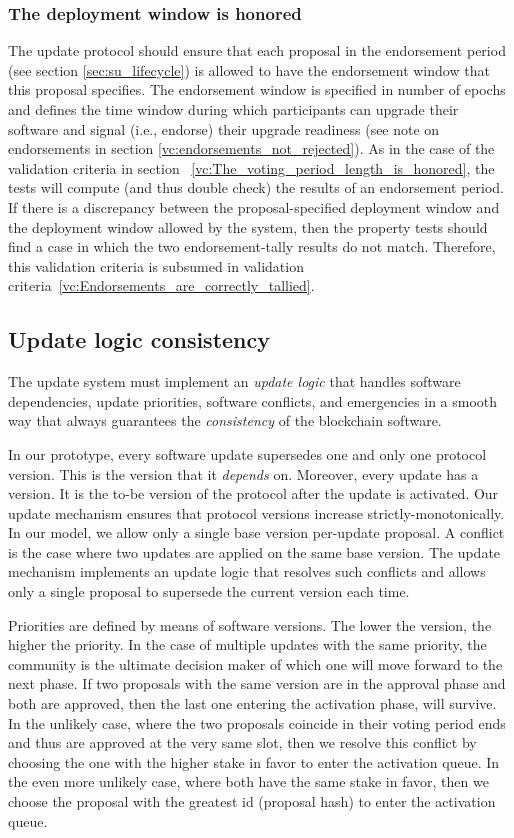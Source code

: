 \subsubsection{The deployment window is honored}
\label{vc:The_deployment_window_is_honored}

The update protocol should ensure that each proposal in the endorsement period
(see section \ref{sec:su_lifecycle}) is allowed to have the endorsement window
that this proposal specifies. The endorsement window is specified in number of
epochs and defines the time window during which participants can upgrade their
software and signal (i.e., endorse) their upgrade readiness (see note on
endorsements in  section \ref{vc:endorsements_not_rejected}).
%
As in the case of the validation
criteria in section ~\ref{vc:The_voting_period_length_is_honored}, the tests 
will compute
(and thus double check) the results of an endorsement period. If there is a
discrepancy between the proposal-specified deployment window and the deployment
window allowed by the system, then the property tests should find a case in
which the two endorsement-tally results do not match. Therefore, this
validation criteria is subsumed in validation
criteria~\ref{vc:Endorsements_are_correctly_tallied}.

\subsection{Update logic consistency}\label{sec:update_logic}
The update system must implement an \emph{update logic} that handles software
dependencies, update priorities, software conflicts, and emergencies in a
smooth way that always guarantees the \emph{consistency} of the blockchain
software.

In our prototype, every software update supersedes one and only one protocol
version. This is the version that it \emph{depends} on. Moreover, every update
has a version. It is the to-be version of the protocol after the update is
activated. Our update mechanism ensures that protocol versions
increase strictly-monotonically. In our model, we allow only a single base
version per-update proposal. A conflict is the case where two updates are
applied on the same base version. The update mechanism implements an update
logic that resolves such conflicts and allows only a single proposal to
supersede the current version each time.

Priorities are defined by means of software versions. The lower the version,
the higher the priority. In the case of multiple updates with the same
priority,
the community is the ultimate decision maker of which one will move forward to
the next phase. If two proposals with the same version are in the approval
phase and both are approved, then the last one entering the activation phase,
will survive. In the unlikely case, where the two proposals coincide in their
voting period  ends and thus are approved at the very same slot, then we
resolve this conflict by choosing the one with the higher stake in favor to
enter the activation queue. In the even more unlikely case, where both have the
same stake in favor, then we choose the proposal with the greatest id (proposal
hash) to enter the activation queue.

